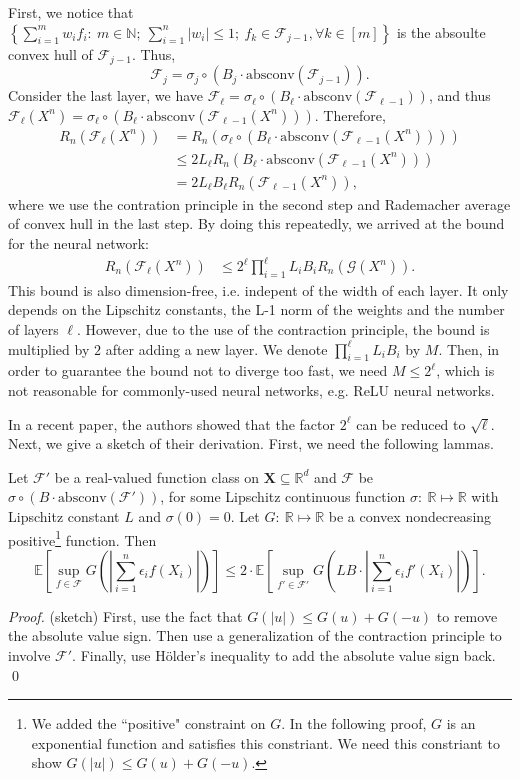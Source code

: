 \documentclass[12pt]{llncs}
\newcommand{\E}[1]{\mathbb{E}\left[#1\right]}
\newcommand{\F}{\mathcal{F}}
\newcommand{\reals}{\mathbb{R}}
\newcommand{\X}{\mathbf{X}}
\begin{document}
First, we notice that $\left\{ \sum_{i=1}^{m} w_i f_i :\ m \in \mathbb{N};\ \sum_{i=1}^{n} |w_i| \leq 1;\ f_k \in \F_{j-1}, \forall k \in [m] \right\}$ is the absoulte convex hull of $\F_{j-1}$. Thus, $$\F_j = \sigma_j \circ (B_j \cdot \text{absconv}(\F_{j-1})).$$ Consider the last layer, we have $\F_\ell = \sigma_\ell \circ (B_\ell \cdot \text{absconv}(\F_{\ell-1}))$, and thus $\F_\ell(X^n) = \sigma_\ell \circ (B_\ell \cdot \text{absconv}(\F_{\ell-1}(X^n)))$. Therefore,
\begin{align*}
  R_n(\F_\ell(X^n)) &= R_n(\sigma_\ell \circ (B_\ell \cdot \text{absconv}(\F_{\ell-1}(X^n))))\\ &\leq 2 L_\ell R_n(B_\ell \cdot \text{absconv}(\F_{\ell-1}(X^n)))\\ &= 2 L_\ell B_\ell R_n(\F_{\ell-1}(X^n)),
\end{align*}
where we use the contration principle in the second step and Rademacher average of convex hull in the last step. By doing this repeatedly, we arrived at the bound for the neural network:
\begin{align}
  R_n(\F_\ell(X^n)) &\leq 2^\ell \prod_{i=1}^{\ell} L_i B_i R_n(\mathcal{G}(X^n)).
\end{align}
This bound is also dimension-free, i.e. indepent of the width of each layer. It only depends on the Lipschitz constants, the L-1 norm of the weights and the number of layers $\ell$. However, due to the use of the contraction principle, the bound is multiplied by $2$ after adding a new layer. We denote $\prod_{i=1}^{\ell} L_i B_i$ by $M$. Then, in order to guarantee the bound not to diverge too fast, we need $M \leq 2^\ell$, which is not reasonable for commonly-used neural networks, e.g. ReLU neural networks.

In a recent paper\cite{golowich2017size}, the authors showed that the factor $2^\ell$ can be reduced to $\sqrt{\ell}$. Next, we give a sketch of their derivation. First, we need the following lammas.

\begin{lemma}
  \label{lemma1}
  Let $\F'$ be a real-valued function class on $\X \subseteq \reals^d$ and $\F$ be $\sigma \circ (B \cdot \text{absconv}(\F'))$, for some Lipschitz continuous function $\sigma :\ \reals \mapsto \reals$ with Lipschitz constant $L$ and $\sigma(0) = 0$. Let $G:\ \reals \mapsto \reals$ be a convex nondecreasing positive\footnote{We added the ``positive" constraint on $G$. In the following proof, $G$ is an exponential function and satisfies this constriant. We need this constriant to show $G(|u|) \leq G(u) + G(-u)$.} function. Then $$\E{\sup\limits_{f \in \F}G\left(\left|\sum_{i=1}^{n}\epsilon_i f(X_i)\right|\right)} \leq 2 \cdot \E{\sup\limits_{f' \in \F'}G\left(LB \cdot \left|\sum_{i=1}^{n}\epsilon_i f'(X_i)\right|\right)}.$$
\end{lemma}
\begin{proof}(sketch) First, use the fact that $G(|u|) \leq G(u) + G(-u)$ to remove the absolute value sign. Then use a generalization of the contraction principle to involve $\F'$. Finally, use H\"older's inequality to add the absolute value sign back. \qed
\end{proof}
\end{document}
